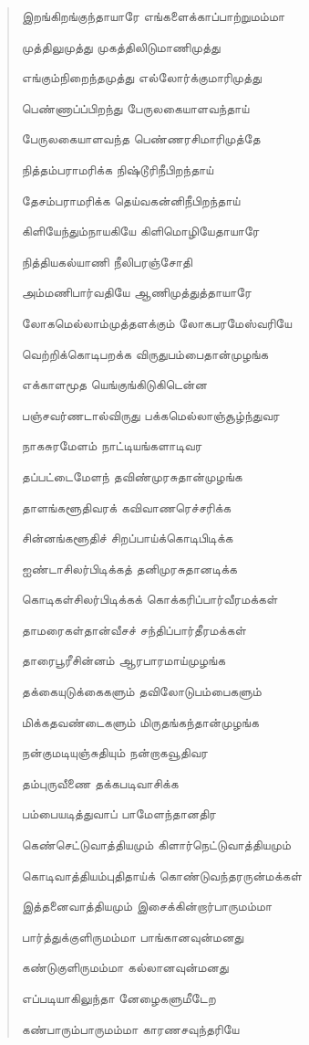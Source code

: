 \documentclass{article}
\begin{document}
\begin{quotation}
{இறங்கிறங்குந்தாயாரே எங்களைக்காப்பாற்றுமம்மா

முத்திலுமுத்து முகத்திலிடுமாணிமுத்து

எங்கும்நிறைந்தமுத்து எல்லாேர்க்குமாரிமுத்து

பெண்ணாப்ப்பிறந்து பேருலகையாளவந்தாய்

பேருலகையாளவந்த பெண்ணரசிமாரிமுத்தே

நித்தம்பராமரிக்க நிஷ்டூரிநீபிறந்தாய்

தேசம்பராமரிக்க தெய்வகன்னிநீபிறந்தாய்

கிளியேந்தும்நாயகியே கிளிமொழியேதாயாரே

நித்தியகல்யாணி நீலிபரஞ்சோதி

அம்மணிபார்வதியே ஆணிமுத்துத்தாயாரே

லோகமெல்லாம்முத்தளக்கும் லோகபரமேஸ்வரியே

வெற்றிக்கொடிபறக்க விருதுபம்பைதான்முழங்க

எக்காளமூத யெங்குங்கிடுகிடென்ன

பஞ்சவர்ணடால்விருது பக்கமெல்லாஞ்சூழ்ந்துவர

நாகசுரமேளம் நாட்டியங்களாடிவர

தப்பட்டைமேளந் தவிண்முரசுதான்முழங்க

தாளங்களூதிவரக் கவிவாணரெச்சரிக்க

சின்னங்களூதிச் சிறப்பாய்க்கொடிபிடிக்க

ஐண்டாசிலர்பிடிக்கத் தனிமுரசுதானடிக்க

கொடிகள்சிலர்பிடிக்கக் கொக்கரிப்பார்வீரமக்கள்

தாமரைகள்தான்வீசச் சந்திப்பார்தீரமக்கள்

தாரைபூரீசின்னம் ஆரபாரமாய்முழங்க

தக்கையுடுக்கைகளும் தவிலோடுபம்பைகளும்

மிக்கதவண்டைகளும் மிருதங்கந்தான்முழங்க

நன்குமடியுஞ்சுதியும் நன்றாகவூதிவர

தம்புருவீணை தக்கபடிவாசிக்க

பம்பையடித்துவாப் பாமேளந்தானதிர

கெண்செட்டுவாத்தியமும் கிளார்நெட்டுவாத்தியமும்

கொடிவாத்தியம்புதிதாய்க் கொண்டுவந்தரருன்மக்கள்

இத்தனைவாத்தியமும் இசைக்கின்றார்பாருமம்மா

பார்த்துக்குளிருமம்மா பாங்கானவுன்மனது

கண்டுகுளிருமம்மா கல்லானவுன்மனது

எப்படியாகிலுந்தா னேழைகளுமீடேற

கண்பாரும்பாருமம்மா காரணசவுந்தரியே

}
\end{quotation}
\end{document}
